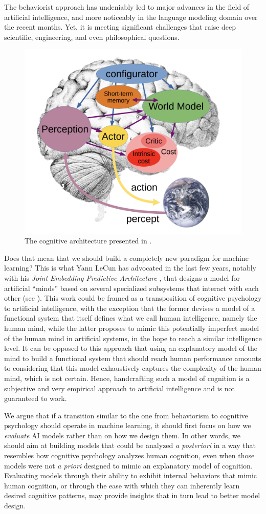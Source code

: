 The behaviorist approach has undeniably led to major advances in the field of artificial intelligence, and more noticeably in the language modeling domain over the recent months. Yet, it is meeting significant challenges that raise deep scientific, engineering, and even philosophical questions.

\begin{figure}[ht]
  \centering
  \includegraphics[width=0.5\linewidth]{sources/imgs/jepa_arch.png}
  \caption{The cognitive architecture presented in \citet{lecun2022path}.}
  \label{fig:lecun_jepa}
\end{figure}

Does that mean that we should build a completely new paradigm for machine learning? This is what Yann LeCun has advocated in the last few years, notably with his \textit{Joint Embedding Predictive Architecture} \citep{lecun2022path}, that designs a model for artificial ``minds'' based on several specialized subsystems that interact with each other (see ). This work could be framed as a transposition of cognitive psychology to artificial intelligence, with the exception that the former devises a model of a functional system that itself defines what we call human intelligence, namely the human mind, while the latter proposes to mimic this potentially imperfect model of the human mind in artificial systems, in the hope to reach a similar intelligence level. It can be opposed to this approach that using an explanatory model of the mind to build a functional system that should reach human performance amounts to considering that this model exhaustively captures the complexity of the human mind, which is not certain. Hence, handcrafting such a model of cognition is a subjective and very empirical approach to artificial intelligence and is not guaranteed to work.

\vspace{1em}

We argue that if a transition similar to the one from behaviorism to cognitive psychology should operate in machine learning, it should first focus on how we \textit{evaluate} AI models rather than on how we design them. In other words, we should aim at building models that could be analyzed \textit{a posteriori} in a way that resembles how cognitive psychology analyzes human cognition, even when those models were not \textit{a priori} designed to mimic an explanatory model of cognition. Evaluating models through their ability to exhibit internal behaviors that mimic human cognition, or through the ease with which they can inherently learn desired cognitive patterns, may provide insights that in turn lead to better model design.

